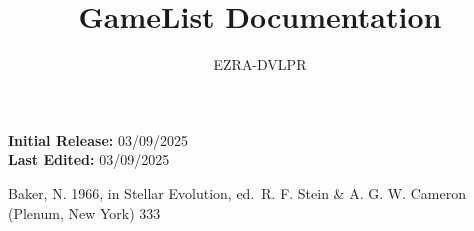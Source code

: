 \documentclass[letterpaper,12pt]{article}
\begin{document}
\title{GameList Documentation}

\author{EZRA-DVLPR}

\date{} %

\maketitle

\begin{center}
	\textbf{Initial Release:} 03/09/2025\\
	\textbf{Last Edited:} 03/09/2025\\
\end{center}

\tableofcontents

\newpage









\begin{thebibliography}{}

	 Baker, N. 1966,
	in Stellar Evolution,
	ed.\ R. F. Stein \& A. G. W. Cameron
	(Plenum, New York) 333

\end{thebibliography}
\end{document}
